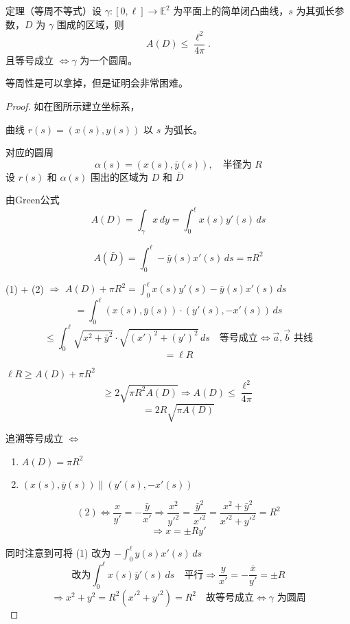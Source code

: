 \documentclass[lang=cn,10pt,thmcnt=section]{elegantbook}
\begin{document}
    \begin{theorem}\label{thm:isoperimetric}
        定理（等周不等式）设 $\gamma : [0, \ell] \rightarrow \mathbb{E}^2$ 为平面上的简单闭凸曲线，$s$ 为其弧长参数，$D$ 为 $\gamma$ 围成的区域，则
        \[
        A(D) \leq \frac{\ell^2}{4\pi}.
        \]
        且等号成立 $\iff \gamma$ 为一个圆周。
        
        \begin{remark}
            等周性是可以拿掉，但是证明会非常困难。
        \end{remark}
        \end{theorem}
\begin{proof}
    如在图所示建立坐标系，

曲线 $r(s) = (x(s), y(s))$ 以 $s$ 为弧长。

对应的圆周
\[
\alpha(s) = (x(s), \bar{y}(s)), \quad \text{半径为 } R
\]
设 $r(s)$ 和 $\alpha(s)$ 围出的区域为 $D$ 和 $\bar{D}$

由Green公式
\[
A(D) = \int_{\gamma} x \, dy = \int_0^{\ell} x(s) y'(s) \, ds \tag{1}
\]

\[
A(\bar{D}) = \int_0^{\ell} -\bar{y}(s) x'(s) \, ds = \pi R^2 \tag{2}
\]

(1) + (2) $\Rightarrow$ $A(D) + \pi R^2 = \int_0^{\ell} x(s) y'(s) - \bar{y}(s) x'(s) \, ds$
\[
= \int_0^{\ell} (x(s), \bar{y}(s)) \cdot (y'(s), -x'(s)) \, ds
\]
\[
\leq \int_0^{\ell} \sqrt{x^2 + \bar{y}^2} \cdot \sqrt{(x')^2 + (y')^2} \, ds \quad \text{等号成立} \Leftrightarrow \vec{a}, \vec{b} \text{ 共线}
\]
\[
= \ell R
\]

$\ell R \geq A(D) + \pi R^2$
\[
\geq 2 \sqrt{\pi R^2 A(D)} \Rightarrow A(D) \leq \frac{\ell^2}{4\pi}
\]
\[
= 2R \sqrt{\pi A(D)}
\]

追溯等号成立 $\Leftrightarrow$
\begin{enumerate}
    \item $A(D) = \pi R^2$
    \item $(x(s), \bar{y}(s)) \parallel (y'(s), -x'(s))$
\end{enumerate}

\[
(2) \Leftrightarrow \frac{x}{y'} = -\frac{\bar{y}}{x'} \Rightarrow \frac{x^2}{y'^2} = \frac{\bar{y}^2}{x'^2} = \frac{x^2 + \bar{y}^2}{x'^2 + y'^2} = R^2
\]
\[
\Rightarrow x = \pm R y'
\]

同时注意到可将 (1) 改为 $-\int_0^{\ell} y(s) x'(s) \, ds$
\[
\text{改为} \int_0^{\ell} x(s) \bar{y}'(s) \, ds \quad \text{平行} \Rightarrow \frac{y}{x'} = -\frac{\bar{x}}{y'} = \pm R
\]
\[
\Rightarrow x^2 + y^2 = R^2 (x'^2 + y'^2) = R^2 \quad \text{故等号成立} \Leftrightarrow \gamma \text{ 为圆周}
\]
\end{proof}   
\end{document}
